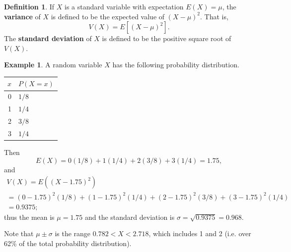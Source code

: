 \documentclass[a4paper,leqno]{article}
\numberwithin{equation}{section}
\theoremstyle{definition}
\newtheorem{defn}[equation]{Definition}
\newtheorem{ex}[equation]{Example}
\theoremstyle{remark}
\newcommand{\df}{\textbf}
\begin{document}
\begin{defn}
  If $ X $ is a standard variable with expectation $ E(X) = \mu $, the \df{variance} of $ X $ is defined to be
  the expected value of $ (X - \mu)^2 $. That is,
  \begin{displaymath}
    V(X) = E[(X - \mu)^2].
  \end{displaymath}
  The \df{standard deviation} of $ X $ is defined to be the positive square root of $ V(X) $.
\end{defn}

\begin{ex}
  A random variable $ X $ has the following probability distribution.
  \begin{center}
    \begin{tabular}{r|l}
      $ x $ & $ P(X = x) $\\\hline
      0 & $ 1/8 $ \\
      1 & $ 1/4 $ \\
      2 & $ 3/8 $ \\
      3 & $ 1/4 $
    \end{tabular}
  \end{center}

  Then
  \begin{displaymath}
    E(X) = 0(1/8) + 1(1/4) + 2(3/8) + 3(1/4) = 1.75,
  \end{displaymath}
  and
  \begin{multline*}
    V(X) = E((X - 1.75)^2)\\ = (0 - 1.75)^2 (1/8) + (1 - 1.75)^2 (1/4) + (2 - 1.75)^2 (3/8) + (3 - 1.75)^2 (1/4)\\ = 0.9375;
  \end{multline*}
  thus the mean is $ \mu = 1.75 $ and the standard deviation is $ \sigma = \sqrt{0.9375} = 0.968 $.

  Note that $ \mu \pm \sigma $ is the range $ 0.782 < X < 2.718 $, which includes 1 and 2 (i.e. over 62\% of the total probability
  distribution).
\end{ex}
\end{document}
